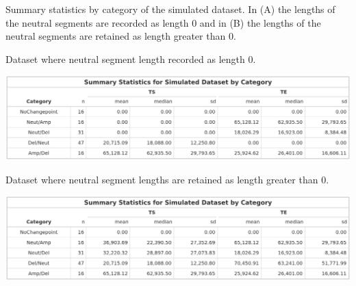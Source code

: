 \begin{table}[!htb]
\caption[Summary statistics by category of the simulated dataset.]{Summary statistics by category of the simulated dataset. In (A) the lengths of the neutral segments are recorded as length 0 and in (B) the lengths of the neutral segments are retained as length greater than 0.} 
\label{tbl:summary_scen3}
\begin{subtable}{1\textwidth}
\centering
 \caption{Dataset where neutral segment length recorded as length 0.}\label{tab:sub_first}
\includegraphics[width = 1\textwidth]{../tables/Chapter_5/Indv_Simulated_Example_Summary_Table_NoNeut.png}
\end{subtable}

\bigskip
\begin{subtable}{1\textwidth}
\caption{Dataset where neutral segment lengths are retained as length greater than 0.}\label{tab:sub_second}
\centering
\includegraphics[width = 1\textwidth]{../tables/Chapter_5/Indv_Simulated_Example_Summary_Table_Neut.png}
\end{subtable}

\label{tab:three_tables}
\end{table}
\vfill 
\clearpage

